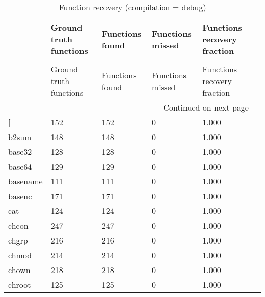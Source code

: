 \begin{longtable}{lp{2.20cm}p{2.20cm}p{2.20cm}p{2.20cm}p{2.20cm}}
\caption{Function recovery (compilation = debug)}
\label{table:functions-O0-debug}\\
\toprule
{} &  Ground truth functions &  Functions found &  Functions missed &  Functions recovery fraction \\
\midrule
\endfirsthead
\caption[]{Function recovery (compilation = debug)} \\
\toprule
{} &  Ground truth functions &  Functions found &  Functions missed &  Functions recovery fraction \\
\midrule
\endhead
\midrule
\multicolumn{5}{r}{{Continued on next page}} \\
\midrule
\endfoot

\bottomrule
\endlastfoot
{[}         &                     152 &              152 &                 0 &                        1.000 \\
b2sum     &                     148 &              148 &                 0 &                        1.000 \\
base32    &                     128 &              128 &                 0 &                        1.000 \\
base64    &                     129 &              129 &                 0 &                        1.000 \\
basename  &                     111 &              111 &                 0 &                        1.000 \\
basenc    &                     171 &              171 &                 0 &                        1.000 \\
cat       &                     124 &              124 &                 0 &                        1.000 \\
chcon     &                     247 &              247 &                 0 &                        1.000 \\
chgrp     &                     216 &              216 &                 0 &                        1.000 \\
chmod     &                     214 &              214 &                 0 &                        1.000 \\
chown     &                     218 &              218 &                 0 &                        1.000 \\
chroot    &                     125 &              125 &                 0 &                        1.000 \\

\end{longtable}
